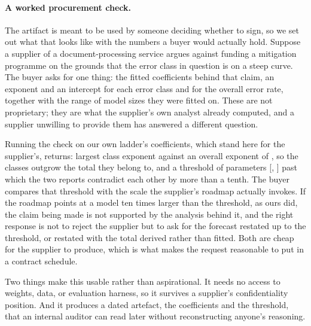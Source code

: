 \documentclass[11pt]{article}
\begin{document}
\paragraph{A worked procurement check.}
The artifact is meant to be used by someone deciding whether to sign, so we set out
what that looks like with the numbers a buyer would actually hold. Suppose a
supplier of a document-processing service argues against funding a mitigation
programme on the grounds that the error class in question is on a steep curve. The
buyer asks for one thing: the fitted coefficients behind that claim, an exponent and
an intercept for each error class and for the overall error rate, together with the
range of model sizes they were fitted on. These are not proprietary; they are what
the supplier's own analyst already computed, and a supplier unwilling to provide
them has answered a different question.

Running the check on our own ladder's coefficients, which stand here for the
supplier's, returns: largest class exponent  against an overall
exponent of , so the classes outgrow the total they belong to,
and a threshold of  parameters
[, ] past which the two reports
contradict each other by more than a tenth. The buyer compares that threshold with
the scale the supplier's roadmap actually invokes. If the roadmap points at a model
ten times larger than the threshold, as ours did, the claim being made is not
supported by the analysis behind it, and the right response is not to reject the
supplier but to ask for the forecast restated up to the threshold, or restated with
the total derived rather than fitted. Both are cheap for the supplier to produce,
which is what makes the request reasonable to put in a contract schedule.

Two things make this usable rather than aspirational. It needs no access to weights,
data, or evaluation harness, so it survives a supplier's confidentiality position.
And it produces a dated artefact, the coefficients and the threshold, that an
internal auditor can read later without reconstructing anyone's reasoning.
\end{document}
